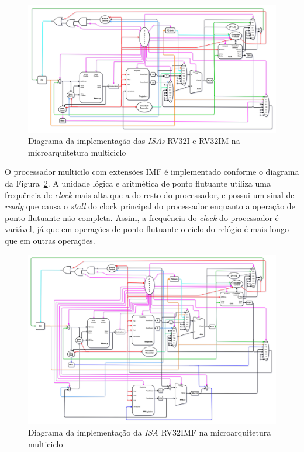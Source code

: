         \begin{figure}[H]
        \centering
            \includegraphics[width=.9\linewidth]{../images/uarch_diagrams/multicycle-RV32I-RV32IM.png}
            \caption{Diagrama da implementação das \textit{ISAs} RV32I e RV32IM na
            microarquitetura multiciclo}\label{fig:diagram_rv32i_multi}
        \end{figure}

        { O processador multicilo com extensões IMF é implementado conforme o
            diagrama da Figura~\ref{fig:diagram_rv32imf_multi}. A unidade lógica
            e aritmética de ponto flutuante utiliza uma frequência de \textit{clock}
            mais alta que a do resto do processador, e possui um sinal de
            \textit{ready} que causa o \textit{stall} do clock principal do
            processador enquanto a operação de ponto flutuante não completa.
            Assim, a frequência do \textit{clock} do processador é variável, já
            que em operações de ponto flutuante o ciclo do relógio é mais longo
            que em outras operações.
        }

        \begin{figure}[H]
        \centering
            \includegraphics[width=.9\linewidth]{../images/uarch_diagrams/multicycle-RV32IMF.png}
            \caption{Diagrama da implementação da \textit{ISA} RV32IMF na
            microarquitetura multiciclo}\label{fig:diagram_rv32imf_multi}
        \end{figure}


